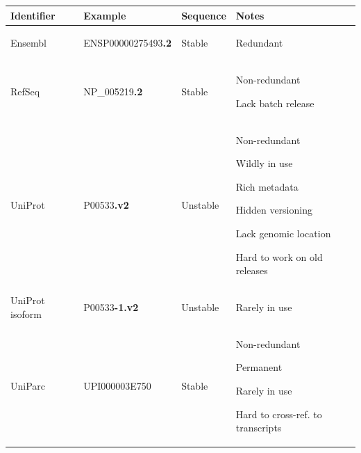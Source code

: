 \begin{SingleSpace}
\begin{table}[tbp]
    \vspace{0.5\baselineskip}
    \begin{subtable}{1\linewidth}
        \centering
        \label{tab:intro-anno-protein}
        \begin{tabular}{lllp{15em}}
            \toprule
            Identifier      & Example           & Sequence   & Notes \\
            \midrule
            Ensembl         & ENSP00000275493\textbf{.2}    & Stable &
            \begin{tablist}
                \item Redundant
            \end{tablist}\\
            RefSeq          & NP\_005219\textbf{.2}         & Stable &
            \begin{tablist}
                \item Non-redundant
                \item Lack batch release
            \end{tablist}\\
            UniProt         & P00533\textbf{.v2}            & Unstable &
            \begin{tablist}
                \item Non-redundant
                \item Wildly in use
                \item Rich metadata
                \item Hidden versioning
                \item Lack genomic location
                \item Hard to work on old releases
            \end{tablist}\\
            UniProt isoform & P00533\textbf{-1.v2}          & Unstable &
            \begin{tablist}
                \item Rarely in use
            \end{tablist}\\
            UniParc         & UPI000003E750                 & Stable &
            \begin{tablist}
                \item Non-redundant
                \item Permanent
                \item Rarely in use
                \item Hard to cross-ref. to transcripts
            \end{tablist}\\
            \bottomrule
        \end{tabular}
    \end{subtable}
\end{table}
\end{SingleSpace}

